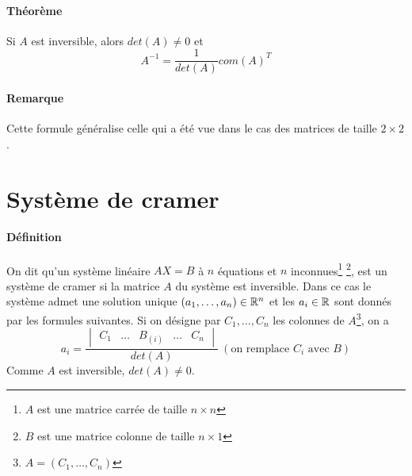 \paragraph{Théorème} Si $A$ est inversible, alors $det(A) \neq 0$ et 
$$A^{-1} = \frac{1}{det(A)} com(A)^{T}$$

\paragraph{Remarque} Cette formule généralise celle qui a été vue dans le cas des matrices de taille $2 \times 2$.

%
%
\section{Système de cramer}
%
%
\paragraph{Définition} On dit qu'un système linéaire $A X = B$ à $n$ équations et $n$ inconnues\footnote{$A$ est une matrice carrée de taille $n \times n$} \footnote{$B$ est une matrice colonne de taille $n\times 1$}, est un système de cramer si la matrice $A$ du système est inversible. Dans ce cas le système admet une solution unique $(a_1, \ldots, a_n) \in \mathbb{R}^n$ et les $a_i \in \mathbb{R}$ sont donnés par les formules suivantes. Si on désigne par $C_1, \ldots, C_n$ les colonnes de $A$\footnote{$A = (C_1, \ldots, C_n)$}, on a
$$a_i = \frac{\begin{vmatrix} C_1 & \ldots & B_{(i)} & \ldots & C_n \end{vmatrix}}{det(A)} ~ (\text{on remplace } C_i \text{ avec } B)$$
Comme $A$ est inversible, $det(A) \neq 0$.

